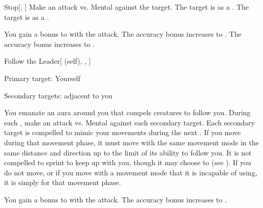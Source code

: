 \lowercase{\hypertarget{spell:Stop}{}}\label{spell:Stop}
\begin{freeability}[Rank 1]{\hypertarget{spell:Stop}{Stop}}[, ]
Make an attack vs. Mental against the target.
\hit The target is  as a .
\crit The target is  as a .

\rankline
{} You gain a  bonus to  with the attack.
 The accuracy bonus increases to .
 The accuracy bonus increases to .
\end{freeability}
\vspace{0.25em}



\lowercase{\hypertarget{spell:Follow the Leader}{}}\label{spell:Follow the Leader}
\begin{attuneability}[Rank 3]{\hypertarget{spell:Follow the Leader}{Follow the Leader}}[ (self), , ]

Primary target: Yourself
\par\noindent
Secondary targets:  adjacent to you

You emanate an aura around you that compels creatures to follow you.
During each , make an attack vs. Mental against each secondary target.
\hit Each secondary target is compelled to mimic your movements during the next .
If you move during that movement phase, it must move with the same movement mode in the same distance and direction up to the limit of its ability to follow you.
It is not compelled to sprint to keep up with you, though it may choose to (see ).
If you do not move, or if you move with a movement mode that it is incapable of using, it is simply  for that movement phase.

\rankline
{} You gain a  bonus to  with the attack.
 The accuracy bonus increases to .
\end{attuneability}
\vspace{0.25em}



